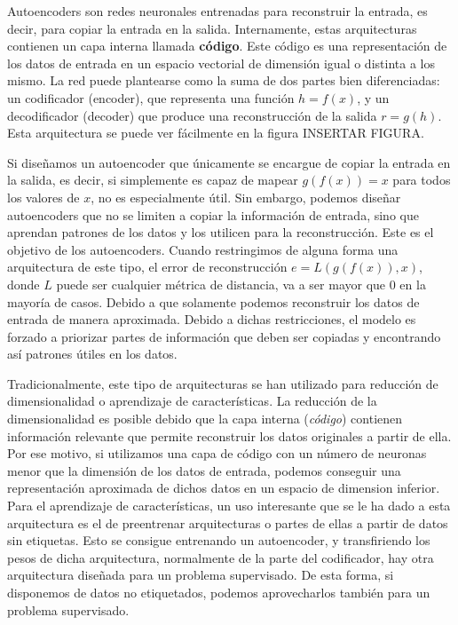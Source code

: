 \documentclass[
  12pt,
  a4paperpaper,
]{report}
\begin{document}
Autoencoders son redes neuronales entrenadas para reconstruir la
entrada, es decir, para copiar la entrada en la salida. Internamente,
estas arquitecturas contienen un capa interna llamada \textbf{código}.
Este código es una representación de los datos de entrada en un espacio
vectorial de dimensión igual o distinta a los mismo. La red puede
plantearse como la suma de dos partes bien diferenciadas: un codificador
(encoder), que representa una función \(h=f(x)\), y un decodificador
(decoder) que produce una reconstrucción de la salida \(r = g(h)\). Esta
arquitectura se puede ver fácilmente en la figura INSERTAR FIGURA.

Si diseñamos un autoencoder que únicamente se encargue de copiar la
entrada en la salida, es decir, si simplemente es capaz de mapear
\(g(f(x)) = x\) para todos los valores de \(x\), no es especialmente
útil. Sin embargo, podemos diseñar autoencoders que no se limiten a
copiar la información de entrada, sino que aprendan patrones de los
datos y los utilicen para la reconstrucción. Este es el objetivo de los
autoencoders. Cuando restringimos de alguna forma una arquitectura de
este tipo, el error de reconstrucción \(e = L(g(f(x)), x)\), donde \(L\)
puede ser cualquier métrica de distancia, va a ser mayor que 0 en la
mayoría de casos. Debido a que solamente podemos reconstruir los datos
de entrada de manera aproximada. Debido a dichas restricciones, el
modelo es forzado a priorizar partes de información que deben ser
copiadas y encontrando así patrones útiles en los datos.

Tradicionalmente, este tipo de arquitecturas se han utilizado para
reducción de dimensionalidad o aprendizaje de características. La
reducción de la dimensionalidad es posible debido que la capa interna
(\emph{código}) contienen información relevante que permite reconstruir
los datos originales a partir de ella. Por ese motivo, si utilizamos una
capa de código con un número de neuronas menor que la dimensión de los
datos de entrada, podemos conseguir una representación aproximada de
dichos datos en un espacio de dimension inferior. Para el aprendizaje de
características, un uso interesante que se le ha dado a esta
arquitectura es el de preentrenar arquitecturas o partes de ellas a
partir de datos sin etiquetas. Esto se consigue entrenando un
autoencoder, y transfiriendo los pesos de dicha arquitectura,
normalmente de la parte del codificador, hay otra arquitectura diseñada
para un problema supervisado. De esta forma, si disponemos de datos no
etiquetados, podemos aprovecharlos también para un problema supervisado.
\end{document}
